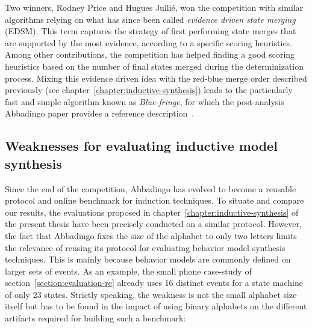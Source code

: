 Two winners, Rodney Price and Hugues Julli\'e, won the competition with similar algorithms relying on what has since been called \emph{evidence driven state merging} (EDSM). This term captures the strategy of first performing state merges that are supported by the most evidence, according to a specific scoring heuristics. Among other contributions, the competition has helped finding a good scoring heuristics based on the number of final states merged during the determinization process. Mixing this evidence driven idea with the red-blue merge order described previously (see chapter~\ref{chapter:inductive-synthesis}) leads to the particularly fast and simple algorithm known as \emph{Blue-fringe}, for which the post-analysis Abbadingo paper provides a reference description~\cite{Lang98}.

\subsection{Weaknesses for evaluating inductive model synthesis}

Since the end of the competition, Abbadingo has evolved to become a reusable protocol and online benchmark for induction techniques. To situate and compare our results, the evaluations proposed in chapter~\ref{chapter:inductive-synthesis} of the present thesis have been precisely conducted on a similar protocol. However, the fact that Abbadingo fixes the size of the alphabet to only two letters limits the relevance of reusing its protocol for evaluating behavior model synthesis techniques. This is mainly because behavior models are commonly defined on larger sets of events. As an example, the small phone case-study of section~\ref{section:evaluation-re} already uses 16 distinct events for a state machine of only 23 states. Strictly speaking, the weakness is not the small alphabet size itself but has to be found in the impact of using binary alphabets on the different artifacts required for building such a benchmark:

